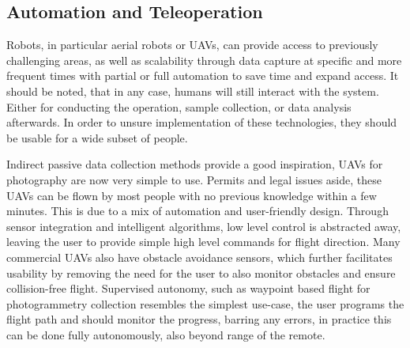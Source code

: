 

\subsection{Automation and Teleoperation}
Robots, in particular aerial robots or UAVs, can provide access to previously challenging areas, as well as scalability through data capture at specific and more frequent times with partial or full automation to save time and expand access. It should be noted, that in any case, humans will still interact with the system. Either for conducting the operation, sample collection, or data analysis afterwards. In order to unsure implementation of these technologies, they should be usable for a wide subset of people.

Indirect passive data collection methods provide a good inspiration, UAVs for photography are now very simple to use. Permits and legal issues aside, these UAVs can be  flown by most people with no previous knowledge within a few minutes. This is due to a mix of automation and user-friendly design. Through sensor integration and intelligent algorithms, low level control is abstracted away, leaving the user to provide simple high level commands for flight direction. Many commercial UAVs also have obstacle avoidance sensors, which further facilitates usability by removing the need for the user to also monitor obstacles and ensure collision-free flight. Supervised autonomy, such as waypoint based flight for photogrammetry collection resembles the simplest use-case, the user programs the flight path and should monitor the progress, barring any errors, in practice this can be done fully autonomously, also beyond range of the remote.

